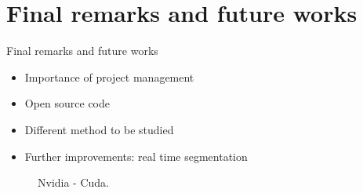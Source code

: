 \documentclass[10pt]{beamer}
\begin{document}
\section{Final remarks and future works}
\begin{frame}{Final remarks and future works}
\begin{itemize}
  \item Importance of project management
  \item Open source code
  \item Different method to be studied
  \item Further improvements: real time segmentation
\end{itemize}

\begin{figure}
  \centering
  \caption{Nvidia - Cuda.}
  \end{figure}
  
\end{frame}
\end{document}
